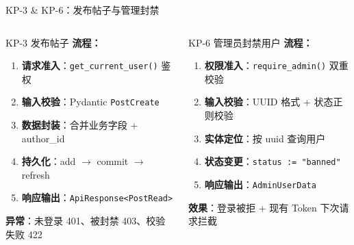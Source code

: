 \documentclass[aspectratio=169,UTF8]{ctexbeamer}
\begin{document}
\begin{frame}{KP-3 \& KP-6：发布帖子与管理封禁}
    \begin{columns}[T]
        \begin{block}{KP-3 发布帖子}
            \textbf{流程：}
            \begin{enumerate}
                \item \textbf{请求准入}：\texttt{get\_current\_user()} 鉴权
                \item \textbf{输入校验}：Pydantic \texttt{PostCreate}
                \item \textbf{数据封装}：合并业务字段 + author\_id
                \item \textbf{持久化}：add $\rightarrow$ commit $\rightarrow$ refresh
                \item \textbf{响应输出}：\texttt{ApiResponse<PostRead>}
            \end{enumerate}
            \textbf{异常}：未登录 401、被封禁 403、校验失败 422
        \end{block}
        \begin{block}{KP-6 管理员封禁用户}
            \textbf{流程：}
            \begin{enumerate}
                \item \textbf{权限准入}：\texttt{require\_admin()} 双重校验
                \item \textbf{输入校验}：UUID 格式 + 状态正则校验
                \item \textbf{实体定位}：按 uuid 查询用户
                \item \textbf{状态变更}：\texttt{status := "banned"}
                \item \textbf{响应输出}：\texttt{AdminUserData}
            \end{enumerate}
            \textbf{效果}：登录被拒 + 现有 Token 下次请求拦截
        \end{block}
    \end{columns}
\end{frame}
\end{document}
